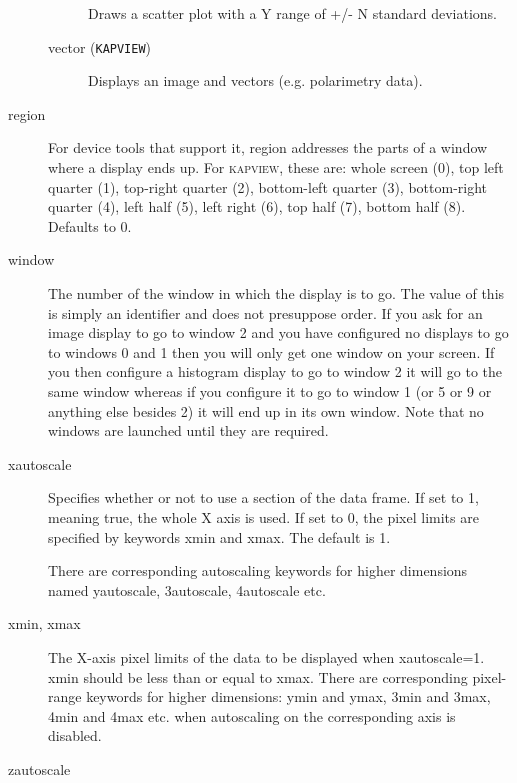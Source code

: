 \documentclass[twoside,11pt]{article}
\renewcommand{\_}{\texttt{\symbol{95}}}
\newcommand{\kapview}{\textsc{kapview}}
\begin{document}
\begin{description}
\begin{description}
Draws a scatter plot with a Y range of +/- N standard deviations.

\item[vector (\texttt{KAPVIEW})] \mbox{}

Displays an image and vectors (e.g. polarimetry data).

\end{description}
\item[region] \mbox{}

For device tools that support it, region addresses the parts of a
window where a display ends up. For \kapview, these are: whole screen
(0), top left quarter (1), top-right quarter (2), bottom-left quarter
(3), bottom-right quarter (4), left half (5), left right (6), top half 
(7), bottom half (8).  Defaults to 0.

\item[window] \mbox{}

The number of the window in which the display is to go. The value of
this is simply an identifier and does not presuppose order. If you ask 
for an image display to go to window 2 and you have configured no
displays to go to windows 0 and 1 then you will only get one window on 
your screen. If you then configure a histogram display to go to window 
2 it will go to the same window whereas if you configure it to go to
window 1 (or 5 or 9 or anything else besides 2) it will end up in its
own window. Note that no windows are launched until they are
required.

\item[xautoscale] \mbox{}

Specifies whether or not to use a section of the data frame.  If set to
1, meaning true, the whole X axis is used.  If set to 0, the pixel limits
are specified by keywords xmin and xmax.  The default is 1.



There are corresponding autoscaling keywords for higher dimensions
named yautoscale, 3autoscale, 4autoscale etc.

\item[xmin, xmax] \mbox{}

The X-axis pixel limits of the data to be displayed when xautoscale=1.
xmin should be less than or equal to xmax.  There are corresponding
pixel-range keywords for higher dimensions: ymin and ymax, 3min and
3max, 4min and 4max etc. when autoscaling on the corresponding axis is
disabled.

\item[zautoscale] \mbox{}


\end{description}
\end{document}
